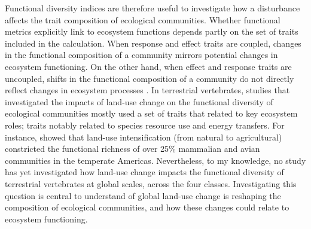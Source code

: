 Functional diversity indices are therefore useful to investigate how a disturbance affects the trait composition of ecological communities. Whether functional metrics explicitly link to ecosystem functions depends partly on the set of traits included in the calculation. When response and effect traits are coupled, changes in the functional composition of a community mirrors potential changes in ecosystem functioning. On the other hand, when effect and response traits are uncoupled, shifts in the functional composition of a community do not directly reflect changes in ecosystem processes \citep{Luck2013}. In terrestrial vertebrates, studies that investigated the impacts of land-use change on the functional diversity of ecological communities mostly used a set of traits that related to key ecosystem roles; traits notably related to species resource use and energy transfers. For instance, \citet{Flynn2009} showed that land-use intensification (from natural to agricultural) constricted the functional richness of over 25\% mammalian and avian communities in the temperate Americas. Nevertheless, to my knowledge, no study has yet investigated how land-use change impacts the functional diversity of terrestrial vertebrates at global scales, across the four classes. Investigating this question is central to understand of global land-use change is reshaping the composition of ecological communities, and how these changes could relate to ecosystem functioning.

